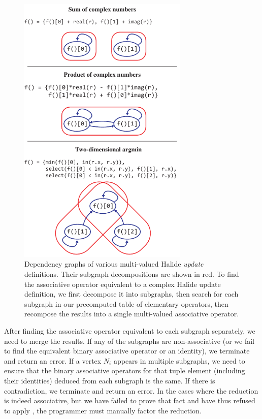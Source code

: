 \begin{figure}
\centering
\includegraphics[width=3.2in]{subgraphs}
\caption{Dependency graphs of various multi-valued Halide \emph{update} definitions. Their subgraph decompositions are shown in red. To find the associative operator equivalent to a complex Halide update definition, we first decompose it into subgraphs, then search for each subgraph in our precomputed table of elementary operators, then recompose the results into a single multi-valued associative operator.}
\label{fig:subgraphs}
\end{figure}

After finding the associative operator equivalent to each subgraph separately, we need to merge the results. If any of the subgraphs are non-associative (or we fail to find the equivalent binary associative operator or an identity), we terminate and return an error. If a vertex $N_i$ appears in multiple subgraphs, we need to ensure that the binary associative operators for that tuple element (including their identities) deduced from each subgraph is the same. If there is contradiction, we terminate and return an error. In the cases where the reduction is indeed associative, but we have failed to prove that fact and have thus refused to apply , the programmer must manually factor the reduction.

